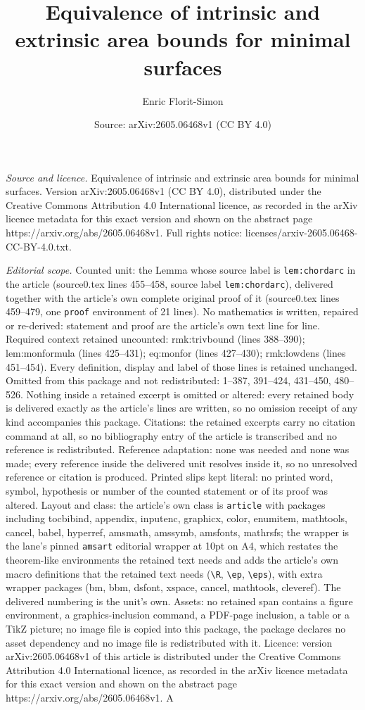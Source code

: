 \documentclass[10pt,a4paper]{amsart}
\title[Equivalence of intrinsic and extrinsic area bounds for minim]{Equivalence of intrinsic and extrinsic area bounds for minimal surfaces}
\author{Enric Florit-Simon}
\date{Source: arXiv:2605.06468v1 (CC BY 4.0)}
\begin{document}
\maketitle

\noindent\emph{Source and licence.} Equivalence of intrinsic and extrinsic area bounds for minimal surfaces. Version arXiv:2605.06468v1 (CC BY 4.0), distributed under the Creative Commons Attribution 4.0 International licence, as recorded in the arXiv licence metadata for this exact version and shown on the abstract page https://arxiv.org/abs/2605.06468v1. Full rights notice: licenses/arxiv-2605.06468-CC-BY-4.0.txt.\par\smallskip

\noindent\textit{Editorial scope.} Counted unit: the Lemma whose source label is \texttt{lem:chordarc} in the article (source0.tex lines 455--458, source label \texttt{lem:chordarc}), delivered together with the article's own complete original proof of it (source0.tex lines 459--479, one \texttt{proof} environment of 21 lines). No mathematics is written, repaired or re-derived: statement and proof are the article's own text line for line. Required context retained uncounted: rmk:trivbound (lines 388--390); lem:monformula (lines 425--431); eq:monfor (lines 427--430); rmk:lowdens (lines 451--454). Every definition, display and label of those lines is retained unchanged. Omitted from this package and not redistributed: 1--387, 391--424, 431--450, 480--526. Nothing inside a retained excerpt is omitted or altered: every retained body is delivered exactly as the article's lines are written, so no omission receipt of any kind accompanies this package. Citations: the retained excerpts carry no citation command at all, so no bibliography entry of the article is transcribed and no reference is redistributed. Reference adaptation: none was needed and none was made; every reference inside the delivered unit resolves inside it, so no unresolved reference or citation is produced. Printed slips kept literal: no printed word, symbol, hypothesis or number of the counted statement or of its proof was altered. Layout and class: the article's own class is \texttt{article} with packages including tocbibind, appendix, inputenc, graphicx, color, enumitem, mathtools, cancel, babel, hyperref, amsmath, amssymb, amsfonts, mathrsfs; the wrapper is the lane's pinned \texttt{amsart} editorial wrapper at 10pt on A4, which restates the theorem-like environments the retained text needs and adds the article's own macro definitions that the retained text needs (\texttt{\textbackslash R}, \texttt{\textbackslash ep}, \texttt{\textbackslash eps}), with extra wrapper packages (bm, bbm, dsfont, xspace, cancel, mathtools, cleveref). The delivered numbering is the unit's own. Assets: no retained span contains a figure environment, a graphics-inclusion command, a PDF-page inclusion, a table or a TikZ picture; no image file is copied into this package, the package declares no asset dependency and no image file is redistributed with it. Licence: version arXiv:2605.06468v1 of this article is distributed under the Creative Commons Attribution 4.0 International licence, as recorded in the arXiv licence metadata for this exact version and shown on the abstract page https://arxiv.org/abs/2605.06468v1. A 
\end{document}

